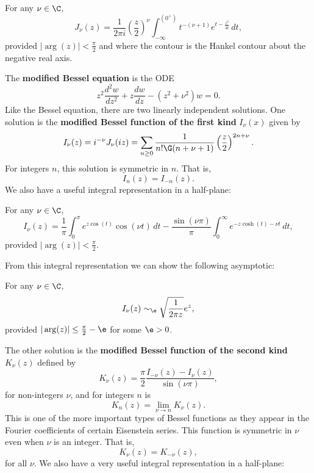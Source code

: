     \begin{proposition}
      For any $\nu \in \C$,
      \[
        J_{\nu}(z) = \frac{1}{2\pi i}\left(\frac{z}{2}\right)^{\nu}\int_{-\infty}^{(0^{+})}t^{-(\nu+1)}e^{t-\frac{z^{2}}{4t}}\,dt,
      \]
      provided $|\arg(z)| < \frac{\pi}{2}$ and where the contour is the Hankel contour about the negative real axis.
    \end{proposition}

    The \textbf{modified Bessel equation} is the ODE
    \[
      z^{2}\frac{d^{2}w}{dz^{2}}+z\frac{dw}{dz}-(z^{2}+\nu^{2})w = 0.
    \]
    Like the Bessel equation, there are two linearly independent solutions. One solution is the \textbf{modified Bessel function of the first kind} $I_{\nu}(x)$ given by
    \[
      I_{\nu}(z) = i^{-\nu}J_{\nu}(iz) = \sum_{n \ge 0}\frac{1}{n!\G(n+\nu+1)}\left(\frac{z}{2}\right)^{2n+\nu}.
    \]
    For integers $n$, this solution is symmetric in $n$. That is,
    \[
      I_{n}(z) = I_{-n}(z).
    \]
    We also have a useful integral representation in a half-plane:

    \begin{proposition}\label{prop:integral_representation_I-Bessel_function}
      For any $\nu \in \C$,
      \[
        I_{\nu}(z) = \frac{1}{\pi}\int_{0}^{\pi}e^{z\cos(t)}\cos(\nu t)\,dt-\frac{\sin(\nu\pi)}{\pi}\int_{0}^{\infty}e^{-z\cosh(t)-\nu t}\,dt,
      \]
      provided $|\arg(z)| < \frac{\pi}{2}$.
    \end{proposition}

    From this integral representation we can show the following asymptotic:

    \begin{lemma}\label{lem:I_Bessel_function_asymptotic}
      For any $\nu \in \C$,
      \[
        I_{\nu}(z) \sim_{\e} \sqrt{\frac{1}{2\pi z}}e^{z},
      \]
      provided $|\arg(z)| \le \frac{\pi}{2}-\e$ for some $\e > 0$.
    \end{lemma}

    The other solution is the \textbf{modified Bessel function of the second kind} $K_{\nu}(z)$ defined by
    \[
      K_{\nu}(z) = \frac{\pi}{2}\frac{I_{-\nu}(z)-I_{\nu}(z)}{\sin(\nu\pi)},
    \]
    for non-integers $\nu$, and for integers $n$ is
    \[
      K_{n}(z)= \lim_{\nu \to n}K_{\nu}(z).
    \]
    This is one of the more important types of Bessel functions as they appear in the Fourier coefficients of certain Eisenstein series. This function is symmetric in $\nu$ even when $\nu$ is an integer. That is,
    \[
      K_{\nu}(z) = K_{-\nu}(z),
    \]
    for all $\nu$. We also have a very useful integral representation in a half-plane:

